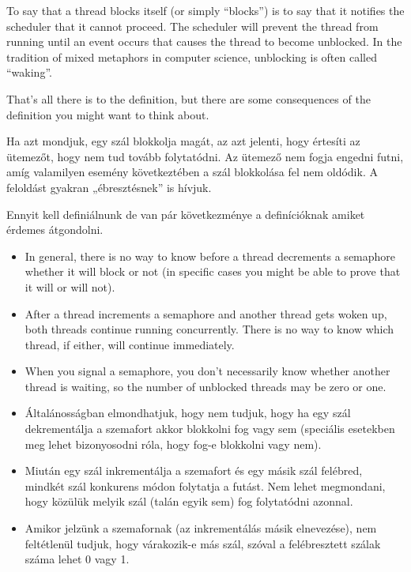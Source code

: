\documentclass{book}
\begin{document}
To say that a thread blocks itself (or simply ``blocks'') is to say
that it notifies the scheduler that it cannot proceed.  The scheduler
will prevent the thread from running until an event occurs that causes
the thread to become unblocked.  In the tradition of mixed metaphors
in computer science, unblocking is often called ``waking''.


That's all there is to the definition, but there are some
consequences of the definition you might want to think about.

Ha azt mondjuk, egy szál blokkolja magát, az azt jelenti, hogy értesíti az ütemezőt,
hogy nem tud tovább folytatódni. Az ütemező nem fogja engedni
futni, amíg valamilyen esemény következtében a szál blokkolása fel nem oldódik.
A feloldást gyakran „ébresztésnek” is hívjuk.

Ennyit kell definiálnunk de van pár következménye a definícióknak
amiket érdemes átgondolni.

\begin{itemize}

\item In general, there is no way to know before a thread decrements a
semaphore whether it will block or not (in specific cases you might
be able to prove that it will or will not).

\item After a thread increments a semaphore and another thread gets
woken up, both threads continue running concurrently.  There is no way
to know which thread, if either, will continue immediately.

\item When you signal a semaphore, you don't necessarily know whether
another thread is waiting, so the number of unblocked threads may
be zero or one.

\end{itemize}

\begin{itemize}

\item Általánosságban elmondhatjuk, hogy nem tudjuk, hogy ha egy szál dekrementálja
a szemafort akkor blokkolni fog vagy sem (speciális esetekben meg
lehet bizonyosodni róla, hogy fog-e blokkolni vagy nem).

\item Miután egy szál inkrementálja a szemafort és egy másik szál felébred, mindkét
szál konkurens módon folytatja a futást. Nem lehet megmondani, hogy
közülük melyik szál (talán egyik sem) fog folytatódni azonnal.

\item Amikor jelzünk a szemafornak (az inkrementálás másik elnevezése),
nem feltétlenül tudjuk, hogy várakozik-e más szál, szóval a felébresztett
szálak száma lehet 0 vagy 1.

\end{itemize}
\end{document}
